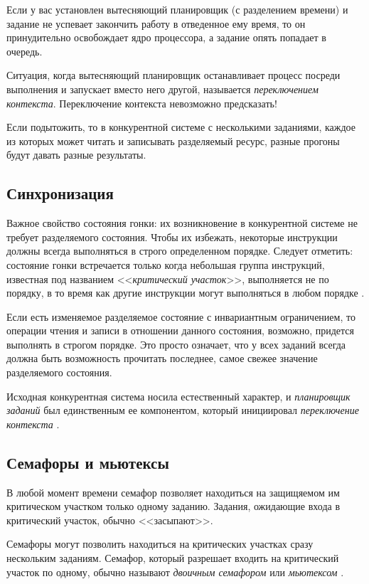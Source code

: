 \documentclass[%
	11pt,
	a4paper,
	utf8,
		]{article}
\begin{document}
Если у вас установлен вытесняющий планировщик (с разделением времени) и задание не успевает закончить работу в отведенное ему время, то он принудительно освобождает ядро процессора, а задание опять попадает в очередь.

Ситуация, когда вытесняющий планировщик останавливает процесс посреди выполнения и запускает вместо него другой, называется \emph{переключением контекста}. Переключение контекста невозможно предсказать!

Если подытожить, то в конкурентной системе с несколькими заданиями, каждое из которых может читать и записывать разделяемый ресурс, разные прогоны будут давать разные результаты.

\subsection{Синхронизация}

Важное свойство состояния гонки: их возникновение в конкурентной системе не требует разделяемого состояния. Чтобы их избежать, некоторые инструкции должны всегда выполняться в строго определенном порядке. Следует отметить: состояние гонки встречается только когда небольшая группа инструкций, известная под названием <<\emph{критический участок}>>, выполняется не по порядку, в то время как другие инструкции могут выполняться в любом порядке \cite[]{amini-extreme-c:2022}.

Если есть изменяемое разделяемое состояние с инвариантным ограничением, то операции чтения и записи в отношении данного состояния, возможно, придется выполнять в строгом порядке. Это просто означает, что у всех заданий всегда должна быть возможность прочитать последнее, самое свежее значение разделяемого состояния.

Исходная конкурентная система носила естественный характер, и \emph{планировщик заданий} был единственным ее компонентом, который инициировал \emph{переключение контекста} \cite[]{amini-extreme-c:2022}.

\subsection{Семафоры и мьютексы}

В любой момент времени семафор позволяет находиться на защищяемом им критическом участком только одному заданию. Задания, ожидающие входа в критический участок, обычно <<засыпают>>.

Семафоры могут позволить находиться на критических участках сразу нескольким заданиям. Семафор, который разрешает входить на критический участок по одному, обычно называют \emph{двоичным семафором} или \emph{мьютексом} \cite[]{amini-extreme-c:2022}.
\end{document}
